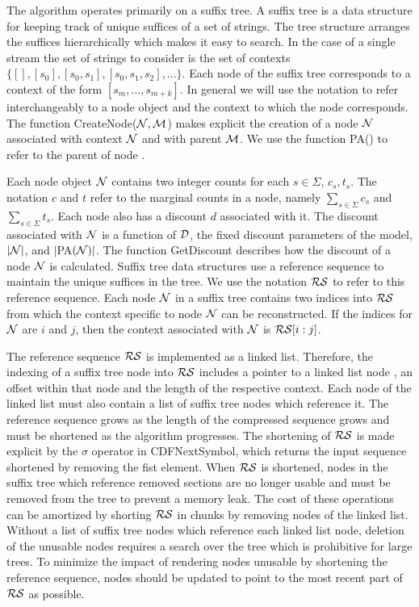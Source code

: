 The algorithm operates primarily on a suffix tree.  A suffix tree is a data structure for keeping track of unique suffices of a set of strings.  The tree structure arranges the suffices hierarchically which makes it easy to search.  In the case of a single stream the set of strings to consider is the set of contexts $\{ [ ], [s_0], [s_0,s_1], [s_0, s_1,s_2], \ldots \}$.   Each node of the suffix tree corresponds to a context of the form $[s_m, \ldots, s_{m + k}]$.  In general we will use the notation \N \space to refer interchangeably to a node object and the context to which the node corresponds. The function CreateNode($\N, \M$) makes explicit the creation of a node $\N$ associated with context $\N$ and with parent $\M$. We use the function PA(\N) to refer to the parent of node \N.

Each node object $\N$ contains two integer counts for each $s \in \Sigma$, $c_s, t_s$.  The notation $c$ and $t$ refer to the marginal counts in a node, namely $\sum_{s \in \Sigma} c_s$ and $\sum_{s \in \Sigma} t_s$.  Each node also has a discount $d$ associated with it.  The discount associated with $\N$ is a function of $\D$, the fixed discount parameters of the model, $|\N|$, and $|$PA$(\N)|$.  The function GetDiscount describes how the discount of a node $\N$ is calculated. Suffix tree data structures use a reference sequence to maintain the unique suffices in the tree.  We use the notation $\RS$ to refer to this reference sequence.  Each node $\N$ in a suffix tree contains two indices into $\RS$ from which the context specific to node $\N$ can be reconstructed.  If the indices for $\N$ are $i$ and $j$, then the context associated with $\N$ is $\RS[i : j]$.

The reference sequence $\RS$ is implemented as a linked list.  Therefore, the indexing of a suffix tree node into $\RS$ includes a pointer to a linked list node , an offset within that node and the length of the respective context.  Each node of the linked list must also contain a list of suffix tree nodes which reference it.  The reference sequence grows as the length of the compressed sequence grows and must be shortened as the algorithm progresses.  The shortening of $\RS$ is made explicit by the $\sigma$ operator in CDFNextSymbol, which returns the input sequence shortened by removing the fist element.  When $\RS$ is shortened, nodes in the suffix tree which reference removed sections are no longer usable and must be removed from the tree to prevent a memory leak.  The cost of these operations can be amortized by shorting $\RS$ in chunks by removing nodes of the linked list.  Without a list of suffix tree nodes which reference each linked list node, deletion of the unusable nodes requires a search over the tree which is prohibitive for large trees.  To minimize the impact of rendering nodes unusable by shortening the reference sequence, nodes should be updated to point to the most recent part of $\RS$ as possible.

